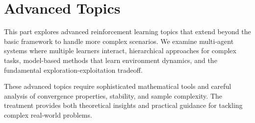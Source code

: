 \part{Advanced Topics}

This part explores advanced reinforcement learning topics that extend beyond the basic framework to handle more complex scenarios. We examine multi-agent systems where multiple learners interact, hierarchical approaches for complex tasks, model-based methods that learn environment dynamics, and the fundamental exploration-exploitation tradeoff.

These advanced topics require sophisticated mathematical tools and careful analysis of convergence properties, stability, and sample complexity. The treatment provides both theoretical insights and practical guidance for tackling complex real-world problems.




